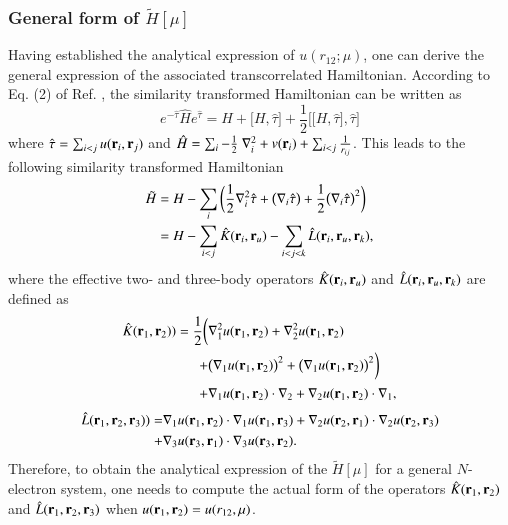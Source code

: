 \documentclass[aip,jcp,reprint,noshowkeys,superscriptaddress]{revtex4-1}
\newcommand{\br}[0]{{\bf {r}}}
\newcommand{\bri}[1]{{\bf r}_{#1}}
\begin{document}
\subsubsection{General form of $\tilde{H}[\mu]$ }
Having established the analytical expression of $u(r_{12};\mu)$, one can derive the general expression of the associated transcorrelated Hamiltonian.  
According to Eq. (2) of Ref. , the similarity transformed Hamiltonian can be written as 
\begin{equation}
 \label{ht_def_g}
 e^{-\hat{\tau}} \hat{H} e^{\hat{\tau}} = H + \big[ H,\hat{\tau} \big] + \frac{1}{2}\bigg[ \big[H,\hat{\tau}\big],\hat{\tau}\bigg]
\end{equation}
where $\hat{\tau} = \sum_{i<j}u(\br{}_i,\br{}_j)$ and $\hat{H} = \sum_i -\frac{1}{2} \nabla^2_i + v(\br{}_i) + \sum_{i<j} \frac{1}{r_{ij}}$. 
This leads to the following similarity transformed Hamiltonian 
\begin{equation}
 \begin{aligned}
 \label{ht_def_gu}
 \tilde{H} & = H - \sum_i \bigg( \frac{1}{2} \nabla_i^2 \hat{\tau} + \big(\nabla_i \hat{\tau} \big) + \frac{1}{2} \big(\nabla_i \hat{\tau} \big)^2  \bigg) \\
           & = H - \sum_{i<j} \hat{K}(\bri{i},\bri{u}) - \sum_{i<j<k} \hat{L}(\bri{i},\bri{u},\bri{k}),
 \end{aligned}
\end{equation}
where the effective two- and three-body operators $\hat{K}(\bri{i},\bri{u})$ and $\hat{L}(\bri{i},\bri{u},\bri{k})$ are defined as
\begin{equation}
 \begin{aligned}
 \label{def_k}
  \hat{K}(\bri{1},\bri{2}) ) = \frac{1}{2} \bigg( &\nabla_1^2 u(\bri{1},\bri{2}) + \nabla_2^2u(\bri{1},\bri{2}) \\
                                               + &\big(\nabla_1 u(\bri{1},\bri{2}) \big) ^2 + \big(\nabla_1 u(\bri{1},\bri{2}) \big) ^2 \bigg) \\
                                               + &\nabla_1 u(\bri{1},\bri{2}) \cdot \nabla_2 + \nabla_2 u(\bri{1},\bri{2}) \cdot \nabla_1,
 \end{aligned}
\end{equation}
\begin{equation}
 \begin{aligned}
 \label{def_k}
  \hat{L}(\bri{1},\bri{2},\bri{3}) ) = & \nabla_1 u(\bri{1},\bri{2}) \cdot \nabla_1 u(\bri{1},\bri{3}) + \nabla_2 u(\bri{2},\bri{1}) \cdot \nabla_2 u(\bri{2},\bri{3})  \\
                                     + & \nabla_3 u(\bri{3},\bri{1}) \cdot \nabla_3 u(\bri{3},\bri{2}).
 \end{aligned}
\end{equation}
Therefore, to obtain the analytical expression of the $\tilde{H}[\mu]$ for a general $N$-electron system, 
one needs to compute the actual form of the operators $\hat{K}(\bri{1},\bri{2})$ and $\hat{L}(\bri{1},\bri{2},\bri{3})$ when $u(\bri{1},\bri{2}) = u(r_{12},\mu)$. 
\end{document}
